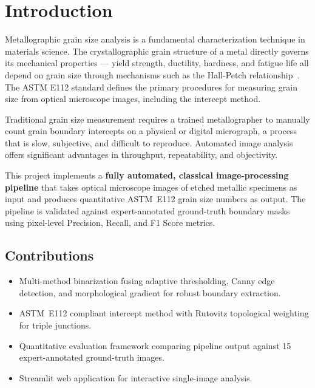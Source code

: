 \documentclass[12pt,a4paper]{article}
\begin{document}
\tableofcontents
\newpage

\section{Introduction}

Metallographic grain size analysis is a fundamental characterization technique
in materials science. The crystallographic grain structure of a metal directly
governs its mechanical properties --- yield strength, ductility, hardness, and
fatigue life all depend on grain size through mechanisms such as the
Hall-Petch relationship~\cite{hallpetch1951}. The ASTM E112 standard
\cite{ASTME112} defines the primary procedures for measuring grain size from
optical microscope images, including the intercept method.

Traditional grain size measurement requires a trained metallographer to
manually count grain boundary intercepts on a physical or digital micrograph,
a process that is slow, subjective, and difficult to reproduce. Automated
image analysis offers significant advantages in throughput, repeatability, and
objectivity.

This project implements a \textbf{fully automated, classical image-processing
pipeline} that takes optical microscope images of etched metallic specimens as
input and produces quantitative ASTM~E112 grain size numbers as output. The
pipeline is validated against expert-annotated ground-truth boundary masks
using pixel-level Precision, Recall, and F1 Score metrics.

\subsection*{Contributions}
\begin{itemize}[leftmargin=*]
    \item Multi-method binarization fusing adaptive thresholding, Canny edge
          detection, and morphological gradient for robust boundary extraction.
    \item ASTM~E112 compliant intercept method with Rutovitz topological
          weighting for triple junctions.
    \item Quantitative evaluation framework comparing pipeline output against
          15 expert-annotated ground-truth images.
    \item Streamlit web application for interactive single-image analysis.
\end{itemize}
\end{document}
